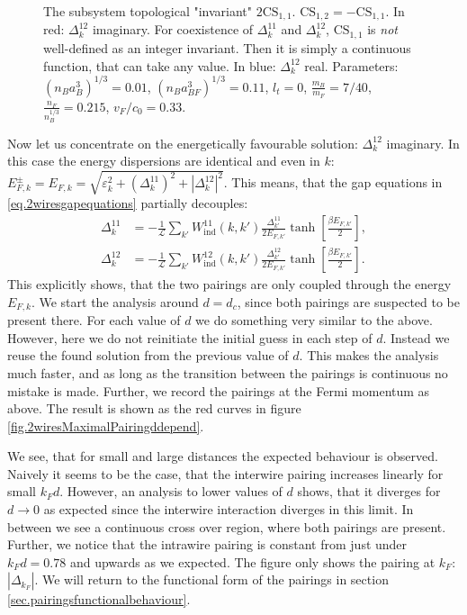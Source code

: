 \begin{figure}
\begin{center}
  
\caption{The subsystem topological "invariant" $2\text{CS}_{1,1}$. $\text{CS}_{1,2} = - \text{CS}_{1,1}$. In red: $\Delta^{12}_k$ imaginary. For coexistence of $\Delta^{11}_k$ and $\Delta^{12}_k$, $\text{CS}_{1,1}$ is \textit{not} well-defined as an integer invariant. Then it is simply a continuous function, that can take any value. In blue: $\Delta^{12}_k$ real. Parameters: $(n_Ba_B^3)^{1/3} = 0.01$, $(n_Ba_{BF}^3)^{1/3} = 0.11$, $l_t = 0$, $\frac{m_B}{m_F} = 7/40$, $\frac{n_F}{n_B^{1/3}} = 0.215$, $v_F/c_0 = 0.33$. }  
\label{fig.2wiresCS11ddepend}
\end{center}    
\end{figure}

Now let us concentrate on the energetically favourable solution: $\Delta^{12}_k$ imaginary. In this case the energy dispersions are identical and even in $k$: $E^{\pm}_{F,k} = E_{F,k} = \sqrt{\varepsilon_k^2 + (\Delta^{11}_k)^2 + |\Delta^{12}_k|^2}$. This means, that the gap equations in \eqref{eq.2wiresgapequations} partially decouples: 
\begin{align}
\Delta^{11}_k &= -\frac{1}{\mathcal{L}}\sum_{k'} W_{\text{ind}}^{11}(k, k')\frac{\Delta^{11}_{k'}}{2E_{F,k'}}\tanh\left[\frac{\beta E_{F,k'}}{2}\right], \nonumber \\
\Delta^{12}_k &= -\frac{1}{\mathcal{L}}\sum_{k'} W_{\text{ind}}^{12}(k, k')\frac{\Delta^{12}_{k'}}{2E_{F,k'}}\tanh\left[\frac{\beta E_{F,k'}}{2}\right].
\label{eq.2wiresgapequationsDelta12imaginary}
\end{align} 
This explicitly shows, that the two pairings are only coupled through the energy $E_{F,k}$. We start the analysis around $d = d_c$, since both pairings are suspected to be present there. For each value of $d$ we do something very similar to the above. However, here we do not reinitiate the initial guess in each step of $d$. Instead we reuse the found solution from the previous value of $d$. This makes the analysis much faster, and as long as the transition between the pairings is continuous no mistake is made. Further, we record the pairings at the Fermi momentum as above. The result is shown as the red curves in figure \ref{fig.2wiresMaximalPairingddepend}.
 
We see, that for small and large distances the expected behaviour is observed. Naively it seems to be the case, that the interwire pairing increases linearly for small $k_Fd$. However, an analysis to lower values of $d$ shows, that it diverges for $d \to 0$ as expected since the interwire interaction diverges in this limit. In between we see a continuous cross over region, where both pairings are present. Further, we notice that the intrawire pairing is constant from just under $k_Fd = 0.78$ and upwards as we expected. The figure only shows the pairing at $k_F$: $|\Delta_{k_F}|$. We will return to the functional form of the pairings in section \ref{sec.pairingsfunctionalbehaviour}.

